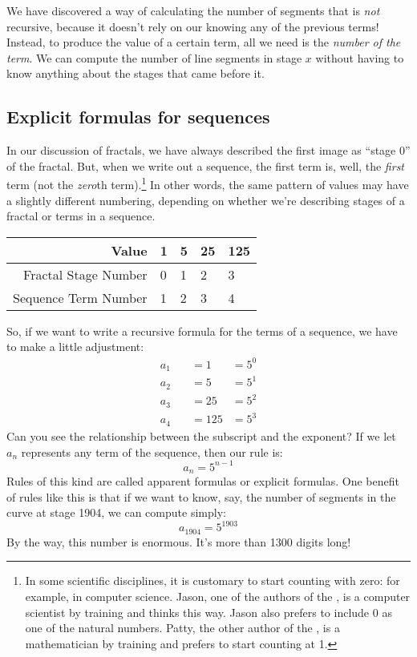 We have discovered a way of calculating the number of segments that is \textit{not} recursive, because it doesn't rely on our knowing any of the previous terms! Instead, to produce the value of a certain term, all we need is the \textit{number of the term}. We can compute the number of line segments in stage $x$ without having to know anything about the stages that came before it.

\subsection{Explicit formulas for sequences}

In our discussion of fractals, we have always described the first image as ``stage 0'' of the fractal. But, when we write out a sequence, the first term is, well, the \textit{first} term (not the \textit{zero}th term).\footnote{In some scientific disciplines, it is customary to start counting with zero: for example, in computer science. Jason, one of the authors of the \algebranomicon, is a computer scientist by training and thinks this way. Jason also prefers to include 0 as one of the natural numbers. Patty, the other author of the \algebranomicon, is a mathematician by training and prefers to start counting at 1.} In other words, the same pattern of values may have a slightly different numbering, depending on whether we're describing stages of a fractal or terms in a sequence.

\begin{center}\begin{tabular}{rC{0.75cm}C{0.75cm}C{0.75cm}C{0.75cm}}
Value & {1} & {5} & {25} & {125}
\\\hline
Fractal Stage Number & 0 & 1 & 2 & 3
\\
Sequence Term Number & 1 & 2 & 3 & 4
\end{tabular}\end{center}

So, if we want to write a recursive formula for the terms of a sequence, we have to make a little adjustment:
\[\begin{aligned}
a_1 &\quad= 1 &= 5^0
\\
a_2 &\quad= 5 &= 5^1
\\
a_3 &\quad= 25 &= 5^2
\\
a_4 &\quad= 125 &= 5^3
\end{aligned}
\]
Can you see the relationship between the subscript and the exponent? If we let $a_n$ represents any term of the sequence, then our rule is:
\[a_n = 5^{n-1}\]
Rules of this kind are called apparent formulas or explicit formulas. One benefit of rules like this is that if we want to know, say, the number of segments in the curve at stage 1904, we can compute simply:
\[a_{1904} = 5^{1903}\]
By the way, this number is enormous. It's more than 1300 digits long!

